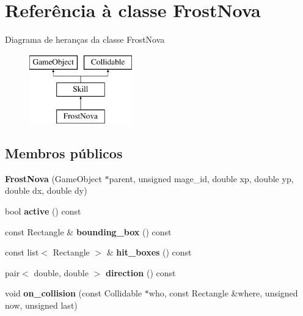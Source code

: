 \hypertarget{classFrostNova}{}\section{Referência à classe Frost\+Nova}
\label{classFrostNova}
Diagrama de heranças da classe Frost\+Nova\begin{figure}[H]
\begin{center}
\leavevmode
\includegraphics[height=3.000000cm]{classFrostNova}
\end{center}
\end{figure}
\subsection*{Membros públicos}
\begin{DoxyCompactItemize}
\item 
\mbox{\label{classFrostNova_aae4bca356b3b1439c74fc259e5fb601d}} 
{\bfseries Frost\+Nova} (Game\+Object $\ast$parent, unsigned mage\+\_\+id, double xp, double yp, double dx, double dy)
\item 
\mbox{\label{classFrostNova_ad294037668fc3609c127c1e69031865b}} 
bool {\bfseries active} () const
\item 
\mbox{\label{classFrostNova_a4d70c5ea288631e425dadcf5e479a1b6}} 
const Rectangle \& {\bfseries bounding\+\_\+box} () const
\item 
\mbox{\label{classFrostNova_aa0dd4571d7eb64ee7270f2afb972b410}} 
const list$<$ Rectangle $>$ \& {\bfseries hit\+\_\+boxes} () const
\item 
\mbox{\label{classFrostNova_a9ec9aeb096b42670bf640ea47f27fd84}} 
pair$<$ double, double $>$ {\bfseries direction} () const
\item 
\mbox{\label{classFrostNova_aeda0ee508c08250e8e36a9a0f2c24d96}} 
void {\bfseries on\+\_\+collision} (const Collidable $\ast$who, const Rectangle \&where, unsigned now, unsigned last)
\end{DoxyCompactItemize}

